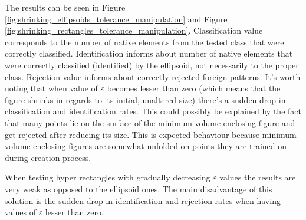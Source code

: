 The results can be seen in Figure \ref{fig:shrinking_ellipsoids_tolerance_manipulation} and Figure \ref{fig:shrinking_rectangles_tolerance_manipulation}. Classification value corresponds to the number of native elements from the tested class that were correctly classified. Identification informs about number of native elements that were correctly classified (identified) by the ellipsoid, not necessarily to the proper class. Rejection value informs about correctly rejected foreign patterns. It's worth noting that when value of $\varepsilon$ becomes lesser than zero (which means that the figure shrinks in regards to its initial, unaltered size) there's a sudden drop in classification and identification rates. This could possibly be explained by the fact that many points lie on the surface of the minimum volume enclosing figure and get rejected after reducing its size. This is expected behaviour because minimum volume enclosing figures are somewhat unfolded on points they are trained on during creation process.

When testing hyper rectangles with gradually decreasing $\varepsilon$ values the results are very weak as opposed to the ellipsoid ones. The main disadvantage of this solution is the sudden drop in identification and rejection rates when having values of $\varepsilon$ lesser than zero.

